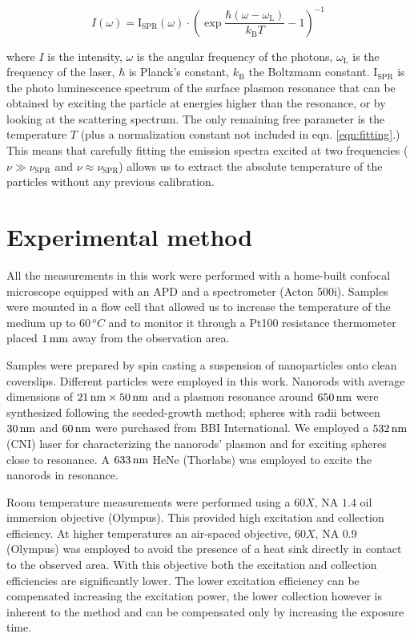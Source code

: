 \begin{equation}\label{eqn:fitting}
	I(\omega) =
	\textrm{I}_{\textrm{SPR}}(\omega)\cdot\left(\exp\frac{\hbar(\omega-\omega_\textrm{L})}{k_\textrm{B}T}-1\right)^{-1}
\end{equation}

\noindent where $I$ is the intensity, $\omega$ is the angular frequency of the
photons, $\omega_\textrm{L}$ is the frequency of the laser, $\hbar$ is Planck's
constant, $k_\textrm{B}$ the Boltzmann constant. $\textrm{I}_{\textrm{SPR}}$ is
the photo luminescence spectrum of the surface plasmon resonance that can be
obtained by exciting the particle at energies higher than the resonance, or by
looking at the scattering spectrum. The only remaining free parameter is the
temperature $T$ (plus a normalization constant not included in eqn.
\ref{eqn:fitting}.) This means that carefully fitting the emission spectra
excited at two frequencies ($\nu\gg\nu_{\textrm{SPR}}$ and
$\nu\approx\nu_{\textrm{SPR}}$) allows us to extract the absolute temperature of
the particles without any previous calibration.


\section{Experimental method}
All the measurements in this work were performed with a home-built confocal
microscope equipped with an APD and a spectrometer (Acton 500i). Samples were
mounted in a flow cell that allowed us to increase the temperature of the medium
up to $60\,^oC$ and to monitor it through a Pt100 resistance thermometer placed
$1\,\textrm{mm}$ away from the observation area.

Samples were prepared by spin casting a suspension of nanoparticles onto clean
coverslips. Different particles were employed in this work. Nanorods with
average dimensions of $21\,\textrm{nm}\times50\,\textrm{nm}$ and a plasmon resonance around $650\,\textrm{nm}$
were synthesized following the seeded-growth method\cite{Nikoobakht2003};
spheres with radii between $30\,\textrm{nm}$ and $60\,\textrm{nm}$ were purchased from BBI
International. We employed a $532\,\textrm{nm}$ (CNI) laser for characterizing the
nanorods' plasmon and for exciting spheres close to resonance. A $633\,\textrm{nm}$ HeNe
(Thorlabs) was employed to excite the nanorods in resonance.

Room temperature measurements were performed using a $60X$, NA $1.4$ oil
immersion objective (Olympus). This provided high excitation and collection
efficiency. At higher temperatures an air-spaced objective, $60X$, NA $0.9$
(Olympus) was employed to avoid the presence of a heat sink directly in contact
to the observed area. With this objective both the excitation and collection
efficiencies are significantly lower. The lower excitation efficiency can be
compensated increasing the excitation power, the lower collection however is
inherent to the method and can be compensated only by increasing the exposure
time.


